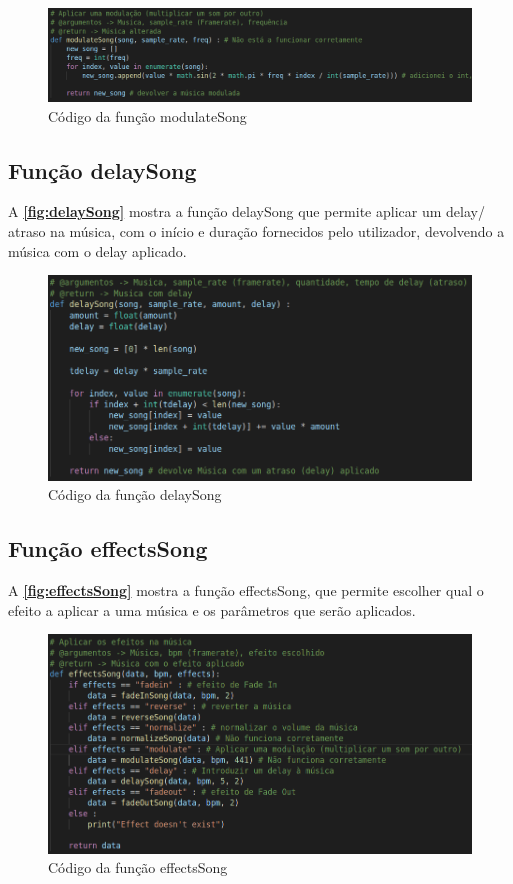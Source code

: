 \documentclass{report}
\begin{document}
\begin{figure}[!h]
\center 
\includegraphics[width=330pt]{img/modulateSong.png}
\caption{Código da função modulateSong}
\label{fig:modulateSong}
\end{figure}

\subsection{Função delaySong}
\label{ssec:delaySong}
A \textbf{\autoref{fig:delaySong}} mostra a função delaySong que permite aplicar um delay/ atraso na música, com o início e
duração fornecidos pelo utilizador, devolvendo a música com o delay aplicado.

\begin{figure}[!h]
\center 
\includegraphics[width=330pt]{img/delaySong.png}
\caption{Código da função delaySong}
\label{fig:delaySong}
\end{figure}

\subsection{Função effectsSong}
\label{ssec:effectsSong}
A \textbf{\autoref{fig:effectsSong}} mostra a função effectsSong, que permite escolher qual o efeito a aplicar a uma música e
os parâmetros que serão aplicados.

\begin{figure}[!h]
\center 
\includegraphics[width=330pt]{img/effectsSong.png}
\caption{Código da função effectsSong}
\label{fig:effectsSong}
\end{figure}
\end{document}
